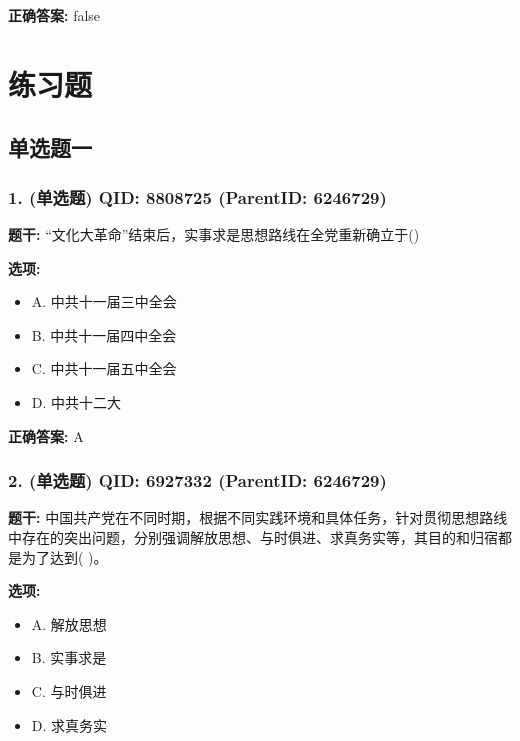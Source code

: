 \documentclass[12pt,UTF8]{ctexart}
\begin{document}
\textbf{正确答案:}
false

\vspace{0.3em}\hrulefill\vspace{0.7em}

\section*{练习题}
\hrulefill

\subsection*{单选题一}

\subsubsection*{1. (单选题) \small QID: 8808725 (ParentID: 6246729)}

\textbf{题干:}
“文化大革命”结束后，实事求是思想路线在全党重新确立于()



\textbf{选项:}
\begin{itemize}[leftmargin=*]

  \item A. 中共十一届三中全会

  \item B. 中共十一届四中全会

  \item C. 中共十一届五中全会

  \item D. 中共十二大

\end{itemize}

\textbf{正确答案:}
A

\vspace{0.3em}\hrulefill\vspace{0.7em}

\subsubsection*{2. (单选题) \small QID: 6927332 (ParentID: 6246729)}

\textbf{题干:}
中国共产党在不同时期，根据不同实践环境和具体任务，针对贯彻思想路线中存在的突出问题，分别强调解放思想、与时俱进、求真务实等，其目的和归宿都是为了达到(   )。



\textbf{选项:}
\begin{itemize}[leftmargin=*]

  \item A. 解放思想

  \item B. 实事求是

  \item C. 与时俱进

  \item D. 求真务实

\end{itemize}
\end{document}
